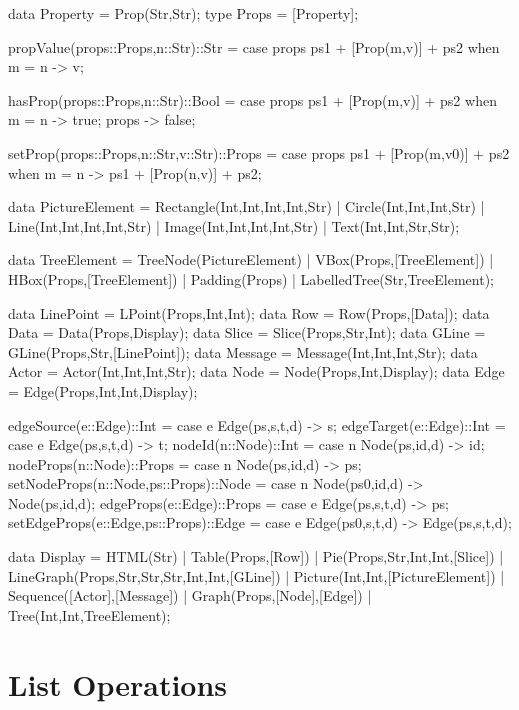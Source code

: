 \documentclass[5p,times]{elsarticle}
\begin{document}
\begin{ESL}
data Property = Prop(Str,Str);
type Props    = [Property];

propValue(props::Props,n::Str)::Str = 
  case props { 
    ps1 + [Prop(m,v)] + ps2 when m = n -> v; 
  }
  
hasProp(props::Props,n::Str)::Bool = 
  case props { 
    ps1 + [Prop(m,v)] + ps2 when m = n -> true; 
    props -> false; 
  }
  
setProp(props::Props,n::Str,v::Str)::Props = 
  case props { 
    ps1 + [Prop(m,v0)] + ps2 when m = n -> 
      ps1 + [Prop(n,v)] + ps2; 
  }


data PictureElement = 
  Rectangle(Int,Int,Int,Int,Str)
| Circle(Int,Int,Int,Str)
| Line(Int,Int,Int,Int,Str)
| Image(Int,Int,Int,Int,Str)
| Text(Int,Int,Str,Str);

data TreeElement = 
   TreeNode(PictureElement)
|  VBox(Props,[TreeElement])
|  HBox(Props,[TreeElement])
|  Padding(Props)
|  LabelledTree(Str,TreeElement);

data LinePoint = LPoint(Props,Int,Int);
data Row       = Row(Props,[Data]);
data Data      = Data(Props,Display);
data Slice     = Slice(Props,Str,Int);
data GLine     = GLine(Props,Str,[LinePoint]);
data Message   = Message(Int,Int,Int,Str);
data Actor     = Actor(Int,Int,Int,Str);
data Node      = Node(Props,Int,Display);
data Edge      = Edge(Props,Int,Int,Display);

edgeSource(e::Edge)::Int  = case e { Edge(ps,s,t,d) -> s; }
edgeTarget(e::Edge)::Int  = case e { Edge(ps,s,t,d) -> t; }
nodeId(n::Node)::Int      = case n { Node(ps,id,d) -> id; }
nodeProps(n::Node)::Props = case n { Node(ps,id,d) -> ps; }
setNodeProps(n::Node,ps::Props)::Node = 
  case n { Node(ps0,id,d) -> Node(ps,id,d); }
edgeProps(e::Edge)::Props = 
  case e { Edge(ps,s,t,d) -> ps; }
setEdgeProps(e::Edge,ps::Props)::Edge = 
  case e { Edge(ps0,s,t,d) -> Edge(ps,s,t,d); }

data Display =         
  HTML(Str)           
| Table(Props,[Row])       
| Pie(Props,Str,Int,Int,[Slice])   
| LineGraph(Props,Str,Str,Str,Int,Int,[GLine]) 
| Picture(Int,Int,[PictureElement])   
| Sequence([Actor],[Message])    
| Graph(Props,[Node],[Edge])   
| Tree(Int,Int,TreeElement);   
\end{ESL}

\section{List Operations}
\end{document}
